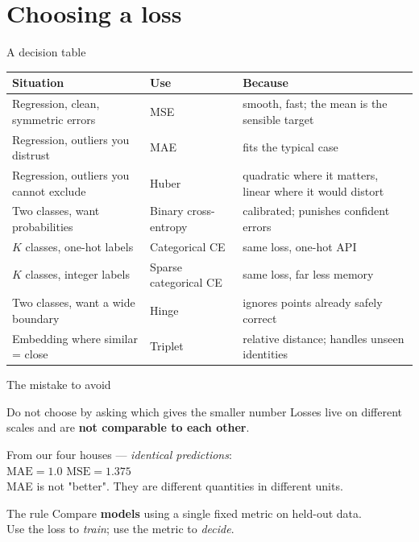 \documentclass[aspectratio=169]{beamer}
\begin{document}
\section{Choosing a loss}
\label{sec:choose}

\begin{frame}[shrink=8]{A decision table}
  \begin{center}\small
  \begin{tabular}{@{}p{4.4cm}p{2.9cm}p{5.6cm}@{}}
    \toprule
    \textbf{Situation} & \textbf{Use} & \textbf{Because}\\
    \midrule
    Regression, clean, symmetric errors & MSE & smooth, fast; the mean is the sensible target\\[2pt]
    Regression, outliers you distrust & MAE & fits the typical case\\[2pt]
    Regression, outliers you cannot exclude & Huber & quadratic where it matters, linear where it would distort\\[2pt]
    Two classes, want probabilities & Binary cross-entropy & calibrated; punishes confident errors\\[2pt]
    $K$ classes, one-hot labels & Categorical CE & same loss, one-hot API\\[2pt]
    $K$ classes, integer labels & Sparse categorical CE & same loss, far less memory\\[2pt]
    Two classes, want a wide boundary & Hinge & ignores points already safely correct\\[2pt]
    Embedding where similar = close & Triplet & relative distance; handles unseen identities\\
    \bottomrule
  \end{tabular}
  \end{center}
\end{frame}

\begin{frame}{The mistake to avoid}
  \begin{alertblock}{Do not choose by asking which gives the smaller number}
    Losses live on different scales and are \textbf{not comparable to each
    other}.
  \end{alertblock}
  \vspace{0.5em}
  \begin{center}
    From our four houses --- \emph{identical predictions}:\\[0.4em]
    $\mathrm{MAE} = 1.0$ \qquad $\mathrm{MSE} = 1.375$\\[0.4em]
    \small MAE is not "better". They are different quantities in different
    units.
  \end{center}
  \vspace{0.6em}
  \begin{exampleblock}{The rule}
    Compare \textbf{models} using a single fixed metric on held-out data.\\
    Use the loss to \emph{train}; use the metric to \emph{decide}.
  \end{exampleblock}
\end{frame}
\end{document}

